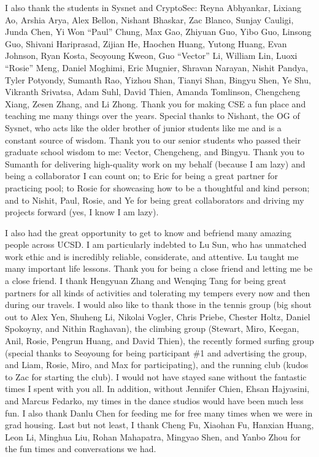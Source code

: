 \begin{acknowledgements}
I also thank the students in Sysnet and CryptoSec: Reyna Abhyankar, Lixiang Ao, Arshia Arya, Alex Bellon, Nishant Bhaskar, Zac Blanco, Sunjay Cauligi, Junda Chen, Yi Won ``Paul'' Chung, Max Gao, Zhiyuan Guo, Yibo Guo, Linsong Guo, Shivani Hariprasad, Zijian He, Haochen Huang, Yutong Huang, Evan Johnson, Ryan Kosta, Seoyoung Kweon, Guo ``Vector'' Li, William Lin, Luoxi ``Rosie'' Meng, Daniel Moghimi, Eric Mugnier, Shravan Narayan, Nishit Pandya, Tyler Potyondy, Sumanth Rao, Yizhou Shan, Tianyi Shan, Bingyu Shen, Ye Shu, Vikranth Srivatsa, Adam Suhl, David Thien, Amanda Tomlinson, Chengcheng Xiang, Zesen Zhang, and Li Zhong.
Thank you for making CSE a fun place and teaching me many things over the years. Special thanks to Nishant, the OG of Sysnet, who acts like the older brother of junior students like me and is a constant source of wisdom. Thank you to our senior students who passed their graduate school wisdom to me: Vector, Chengcheng, and Bingyu. Thank you to Sumanth for delivering high-quality work on my behalf (because I am lazy) and being a collaborator I can count on; to Eric for being a great partner for practicing pool; to Rosie for showcasing how to be a thoughtful and kind person; and to Nishit, Paul, Rosie, and Ye for being great collaborators and driving my projects forward (yes, I know I am lazy).

I also had the great opportunity to get to know and befriend many amazing people across UCSD. I am particularly indebted to Lu Sun, who has unmatched work ethic and is incredibly reliable, considerate, and attentive. Lu taught me many important life lessons. Thank you for being a close friend and letting me be a close friend. I thank Hengyuan Zhang and Wenqing Tang for being great partners for all kinds of activities and tolerating my tempers every now and then during our travels. I would also like to thank those in the tennis group (big shout out to Alex Yen, Shuheng Li, Nikolai Vogler, Chris Priebe, Chester Holtz, Daniel Spokoyny, and Nithin Raghavan), the climbing group (Stewart, Miro, Keegan, Anil, Rosie, Pengrun Huang, and David Thien), the recently formed surfing group (special thanks to Seoyoung for being participant \#1 and advertising the group, and Liam, Rosie, Miro, and Max for participating), and the running club (kudos to Zac for starting the club). I would not have stayed sane without the fantastic times I spent with you all. In addition, without Jennifer Chien, Ehsan Hajyasini, and Marcus Fedarko, my times in the dance studios would have been much less fun. I also thank Danlu Chen for feeding me for free many times when we were in grad housing. Last but not least, I thank Cheng Fu, Xiaohan Fu, Hanxian Huang, Leon Li,  Minghua Liu, Rohan Mahapatra, Mingyao Shen, and Yanbo Zhou for the fun times and conversations we had.


\end{acknowledgements}
